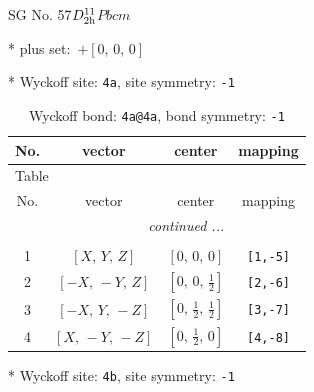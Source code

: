 \documentclass[fleqn,8pt]{jsarticle}
\begin{document}
\setcounter{MaxMatrixCols}{32}

\renewcommand{\tablename}{Table~}
\renewcommand{\figurename}{Figure~}
\begin{center}
\LARGE
SG No. 57\quad$D_{\rm 2h}^{11}$\quad$Pbcm$\quad[ orthorhombic ]
\end{center}

* plus set:\,\,\,$+\left[ 0,\, 0,\, 0 \right]$


* Wyckoff site: {\tt 4a}, site symmetry: {\tt -1}
\renewcommand{\arraystretch}{1.2}
\begin{longtable}{cccc}
\caption{Wyckoff bond: {\tt 4a@4a}, bond symmetry: {\tt -1}}
 \\
 \hline \hline
No. & vector & center & mapping \\ \hline \endfirsthead

\multicolumn{3}{l}{\tablename\ \thetable{}} \\
 \hline \hline
No. & vector & center & mapping \\ \hline \endhead

 \hline \hline
\multicolumn{3}{r}{\footnotesize\it continued ...} \\ \endfoot

 \hline \hline
\multicolumn{3}{r}{} \\ \endlastfoot

1 & $\left[ X,\, Y,\, Z \right]$ & $\left[ 0,\, 0,\, 0 \right]$ & {\tt [1,-5]} \\ \hline
2 & $\left[ - X,\, - Y,\, Z \right]$ & $\left[ 0,\, 0,\, \frac{1}{2} \right]$ & {\tt [2,-6]} \\ \hline
3 & $\left[ - X,\, Y,\, - Z \right]$ & $\left[ 0,\, \frac{1}{2},\, \frac{1}{2} \right]$ & {\tt [3,-7]} \\ \hline
4 & $\left[ X,\, - Y,\, - Z \right]$ & $\left[ 0,\, \frac{1}{2},\, 0 \right]$ & {\tt [4,-8]} \\
\end{longtable}
* Wyckoff site: {\tt 4b}, site symmetry: {\tt -1}
\renewcommand{\arraystretch}{1.2}
\end{document}
